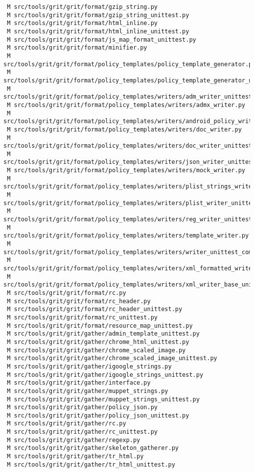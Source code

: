 \documentclass{article}
\begin{document}
\begin{verbatim}
 M src/tools/grit/grit/format/gzip_string.py
 M src/tools/grit/grit/format/gzip_string_unittest.py
 M src/tools/grit/grit/format/html_inline.py
 M src/tools/grit/grit/format/html_inline_unittest.py
 M src/tools/grit/grit/format/js_map_format_unittest.py
 M src/tools/grit/grit/format/minifier.py
 M src/tools/grit/grit/format/policy_templates/policy_template_generator.py
 M src/tools/grit/grit/format/policy_templates/policy_template_generator_unittest.py
 M src/tools/grit/grit/format/policy_templates/writers/adm_writer_unittest.py
 M src/tools/grit/grit/format/policy_templates/writers/admx_writer.py
 M src/tools/grit/grit/format/policy_templates/writers/android_policy_writer_unittest.py
 M src/tools/grit/grit/format/policy_templates/writers/doc_writer.py
 M src/tools/grit/grit/format/policy_templates/writers/doc_writer_unittest.py
 M src/tools/grit/grit/format/policy_templates/writers/json_writer_unittest.py
 M src/tools/grit/grit/format/policy_templates/writers/mock_writer.py
 M src/tools/grit/grit/format/policy_templates/writers/plist_strings_writer_unittest.py
 M src/tools/grit/grit/format/policy_templates/writers/plist_writer_unittest.py
 M src/tools/grit/grit/format/policy_templates/writers/reg_writer_unittest.py
 M src/tools/grit/grit/format/policy_templates/writers/template_writer.py
 M src/tools/grit/grit/format/policy_templates/writers/writer_unittest_common.py
 M src/tools/grit/grit/format/policy_templates/writers/xml_formatted_writer.py
 M src/tools/grit/grit/format/policy_templates/writers/xml_writer_base_unittest.py
 M src/tools/grit/grit/format/rc.py
 M src/tools/grit/grit/format/rc_header.py
 M src/tools/grit/grit/format/rc_header_unittest.py
 M src/tools/grit/grit/format/rc_unittest.py
 M src/tools/grit/grit/format/resource_map_unittest.py
 M src/tools/grit/grit/gather/admin_template_unittest.py
 M src/tools/grit/grit/gather/chrome_html_unittest.py
 M src/tools/grit/grit/gather/chrome_scaled_image.py
 M src/tools/grit/grit/gather/chrome_scaled_image_unittest.py
 M src/tools/grit/grit/gather/igoogle_strings.py
 M src/tools/grit/grit/gather/igoogle_strings_unittest.py
 M src/tools/grit/grit/gather/interface.py
 M src/tools/grit/grit/gather/muppet_strings.py
 M src/tools/grit/grit/gather/muppet_strings_unittest.py
 M src/tools/grit/grit/gather/policy_json.py
 M src/tools/grit/grit/gather/policy_json_unittest.py
 M src/tools/grit/grit/gather/rc.py
 M src/tools/grit/grit/gather/rc_unittest.py
 M src/tools/grit/grit/gather/regexp.py
 M src/tools/grit/grit/gather/skeleton_gatherer.py
 M src/tools/grit/grit/gather/tr_html.py
 M src/tools/grit/grit/gather/tr_html_unittest.py

\end{verbatim}
\end{document}
